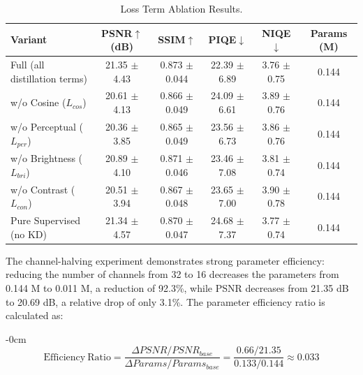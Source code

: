 \documentclass[sensors,article,submit,moreauthors]{Definitions/mdpi}
\begin{document}
\begin{table}[H]
\caption{Loss Term Ablation Results.\label{tab7}}
\begin{tabularx}{\textwidth}{LCCCCC}
\toprule
\textbf{Variant}	& \textbf{PSNR$\uparrow$ (dB)}	& \textbf{SSIM$\uparrow$}	& \textbf{PIQE$\downarrow$}	& \textbf{NIQE$\downarrow$}	& \textbf{Params (M)}\\
\midrule
Full (all distillation terms)	& 21.35 $\pm$ 4.43	& 0.873 $\pm$ 0.044	& 22.39 $\pm$ 6.89	& 3.76 $\pm$ 0.75	& 0.144\\
w/o Cosine ($L_{cos}$)	& 20.61 $\pm$ 4.13	& 0.866 $\pm$ 0.049	& 24.09 $\pm$ 6.61	& 3.89 $\pm$ 0.76	& 0.144\\
w/o Perceptual ($L_{per}$)	& 20.36 $\pm$ 3.85	& 0.865 $\pm$ 0.049	& 23.56 $\pm$ 6.73	& 3.86 $\pm$ 0.76	& 0.144\\
w/o Brightness ($L_{bri}$)	& 20.89 $\pm$ 4.10	& 0.871 $\pm$ 0.046	& 23.46 $\pm$ 7.08	& 3.81 $\pm$ 0.74	& 0.144\\
w/o Contrast ($L_{con}$)	& 20.51 $\pm$ 3.94	& 0.867 $\pm$ 0.048	& 23.65 $\pm$ 7.00	& 3.90 $\pm$ 0.78	& 0.144\\
Pure Supervised (no KD)	& 21.34 $\pm$ 4.57	& 0.870 $\pm$ 0.047	& 24.68 $\pm$ 7.37	& 3.77 $\pm$ 0.74	& 0.144\\
\bottomrule
\end{tabularx}
\end{table}

The channel-halving experiment demonstrates strong parameter efficiency: reducing the number of channels from 32 to 16 decreases the parameters from 0.144 M to 0.011 M, a reduction of 92.3\%, while PSNR decreases from 21.35 dB to 20.69 dB, a relative drop of only 3.1\%. The parameter efficiency ratio is calculated as:

\begin{adjustwidth}{-\extralength}{0cm}
\begin{equation}
\mathrm{Efficiency\ Ratio} = \frac{\Delta PSNR / PSNR_{base}}{\Delta Params / Params_{base}} = \frac{0.66/21.35}{0.133/0.144} \approx 0.033
\end{equation}
\end{adjustwidth}
\end{document}
